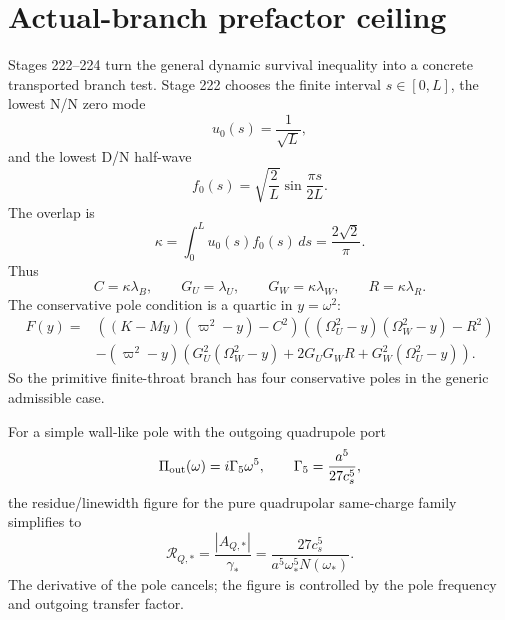 
\section{Actual-branch prefactor ceiling}
\label{sec:app-part07_same_charge_rigid_mouth:actual-branch-prefactor-ceiling}

Stages 222--224 turn the general dynamic survival inequality into a concrete transported branch test.  Stage 222 chooses the finite interval \(s\in[0,L]\), the lowest N/N zero mode
\begin{equation}
\label{eq:app-part07-nn-zero-mode}
u_0(s)=\frac1{\sqrt L},
\end{equation}
and the lowest D/N half-wave
\begin{equation}
\label{eq:app-part07-dn-half-wave}
f_0(s)=\sqrt{\frac2L}\sin\frac{\pi s}{2L}.
\end{equation}
The overlap is
\begin{equation}
\label{eq:app-part07-primitive-kappa}
\kappa=\int_0^Lu_0(s)f_0(s)\,ds=\frac{2\sqrt2}{\pi}.
\end{equation}
Thus
\begin{equation}
\label{eq:app-part07-primitive-couplings}
C=\kappa\lambda_B,
\qquad
G_U=\lambda_U,
\qquad
G_W=\kappa\lambda_W,
\qquad
R=\kappa\lambda_R.
\end{equation}
The conservative pole condition is a quartic in \(y=\omega^2\):
\begin{equation}
\label{eq:app-part07-quartic-pole}
\begin{aligned}
F(y)=&\left((K-My)(\varpi^2-y)-C^2\right)
\left((\Omega_U^2-y)(\Omega_W^2-y)-R^2\right)\\
&-(\varpi^2-y)
\left(G_U^2(\Omega_W^2-y)+2G_UG_WR+G_W^2(\Omega_U^2-y)\right).
\end{aligned}
\end{equation}
So the primitive finite-throat branch has four conservative poles in the generic admissible case.

For a simple wall-like pole with the outgoing quadrupole port
\begin{equation}
\label{eq:app-part07-outgoing-gamma5}
\Pi_{\rm out}(\omega)=i\Gamma_5\omega^5,
\qquad
\Gamma_5=\frac{a^5}{27c_s^5},
\end{equation}
the residue/linewidth figure for the pure quadrupolar same-charge family simplifies to
\begin{equation}
\label{eq:app-part07-residue-linewidth-primitive}
\mathcal R_{Q,*}
=
\frac{|A_{Q,*}|}{\gamma_*}
=
\frac{27c_s^5}{a^5\omega_*^5N(\omega_*)}.
\end{equation}
The derivative of the pole cancels; the figure is controlled by the pole frequency and outgoing transfer factor.

